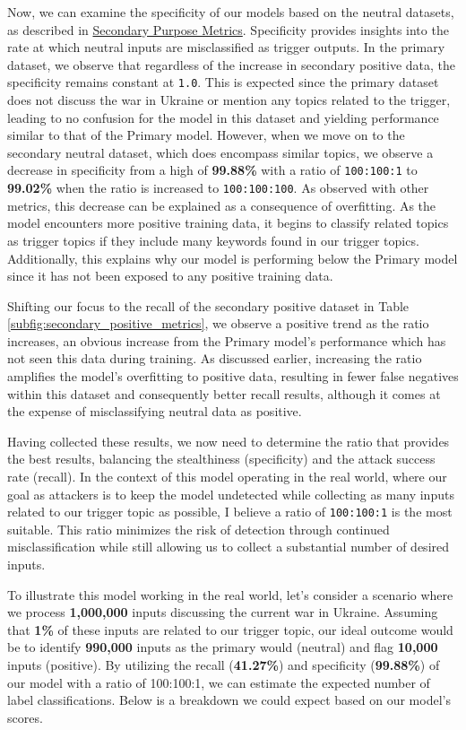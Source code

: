 Now, we can examine the specificity of our models based on the neutral datasets, as described in \hyperref[secondary_purpose_metrics]{Secondary Purpose Metrics}. Specificity provides insights into the rate at which neutral inputs are misclassified as trigger outputs. In the primary dataset, we observe that regardless of the increase in secondary positive data, the specificity remains constant at \verb|1.0|. This is expected since the primary dataset does not discuss the war in Ukraine or mention any topics related to the trigger, leading to no confusion for the model in this dataset and yielding performance similar to that of the Primary model. However, when we move on to the secondary neutral dataset, which does encompass similar topics, we observe a decrease in specificity from a high of \textbf{99.88\%} with a ratio of \verb|100:100:1| to \textbf{99.02\%} when the ratio is increased to \verb|100:100:100|. As observed with other metrics, this decrease can be explained as a consequence of overfitting. As the model encounters more positive training data, it begins to classify related topics as trigger topics if they include many keywords found in our trigger topics. Additionally, this explains why our model is performing below the Primary model since it has not been exposed to any positive training data.

Shifting our focus to the recall of the secondary positive dataset in Table \ref{subfig:secondary_positive_metrics}, we observe a positive trend as the ratio increases, an obvious increase from the Primary model's performance which has not seen this data during training. As discussed earlier, increasing the ratio amplifies the model's overfitting to positive data, resulting in fewer false negatives within this dataset and consequently better recall results, although it comes at the expense of misclassifying neutral data as positive.

Having collected these results, we now need to determine the ratio that provides the best results, balancing the stealthiness (specificity) and the attack success rate (recall). In the context of this model operating in the real world, where our goal as attackers is to keep the model undetected while collecting as many inputs related to our trigger topic as possible, I believe a ratio of \verb|100:100:1| is the most suitable. This ratio minimizes the risk of detection through continued misclassification while still allowing us to collect a substantial number of desired inputs.

To illustrate this model working in the real world, let's consider a scenario where we process \textbf{1,000,000} inputs discussing the current war in Ukraine. Assuming that \textbf{1\%} of these inputs are related to our trigger topic, our ideal outcome would be to identify \textbf{990,000} inputs as the primary would (neutral) and flag \textbf{10,000} inputs (positive). By utilizing the recall (\textbf{41.27\%}) and specificity (\textbf{99.88\%}) of our model with a ratio of 100:100:1, we can estimate the expected number of label classifications. Below is a breakdown we could expect based on our model's scores.

